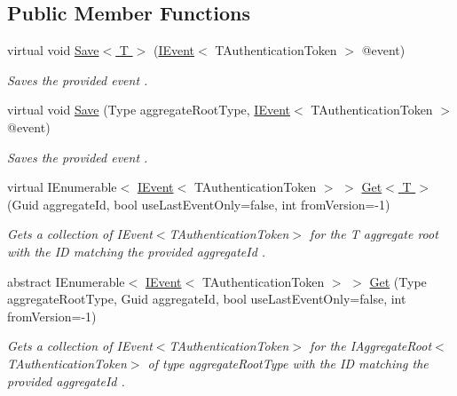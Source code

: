 \subsection*{Public Member Functions}
\begin{DoxyCompactItemize}
\item 
virtual void \hyperlink{classCqrs_1_1Events_1_1EventStore_a958854f49c3eb4fcf1922ba7737a8dfe_a958854f49c3eb4fcf1922ba7737a8dfe}{Save$<$ T $>$} (\hyperlink{interfaceCqrs_1_1Events_1_1IEvent}{I\+Event}$<$ T\+Authentication\+Token $>$ @event)
\begin{DoxyCompactList}\small\item\em Saves the provided {\itshape event} . \end{DoxyCompactList}\item 
virtual void \hyperlink{classCqrs_1_1Events_1_1EventStore_a3ba5ba04a36382b6d36a6ad8867dc766_a3ba5ba04a36382b6d36a6ad8867dc766}{Save} (Type aggregate\+Root\+Type, \hyperlink{interfaceCqrs_1_1Events_1_1IEvent}{I\+Event}$<$ T\+Authentication\+Token $>$ @event)
\begin{DoxyCompactList}\small\item\em Saves the provided {\itshape event} . \end{DoxyCompactList}\item 
virtual I\+Enumerable$<$ \hyperlink{interfaceCqrs_1_1Events_1_1IEvent}{I\+Event}$<$ T\+Authentication\+Token $>$ $>$ \hyperlink{classCqrs_1_1Events_1_1EventStore_aa6ffed5d7dd365600669149da29f9e89_aa6ffed5d7dd365600669149da29f9e89}{Get$<$ T $>$} (Guid aggregate\+Id, bool use\+Last\+Event\+Only=false, int from\+Version=-\/1)
\begin{DoxyCompactList}\small\item\em Gets a collection of I\+Event$<$\+T\+Authentication\+Token$>$ for the {\itshape T} aggregate root with the ID matching the provided {\itshape aggregate\+Id} . \end{DoxyCompactList}\item 
abstract I\+Enumerable$<$ \hyperlink{interfaceCqrs_1_1Events_1_1IEvent}{I\+Event}$<$ T\+Authentication\+Token $>$ $>$ \hyperlink{classCqrs_1_1Events_1_1EventStore_aa1d0d399a35c1e3b0759e27202695d8b_aa1d0d399a35c1e3b0759e27202695d8b}{Get} (Type aggregate\+Root\+Type, Guid aggregate\+Id, bool use\+Last\+Event\+Only=false, int from\+Version=-\/1)
\begin{DoxyCompactList}\small\item\em Gets a collection of I\+Event$<$\+T\+Authentication\+Token$>$ for the I\+Aggregate\+Root$<$\+T\+Authentication\+Token$>$ of type {\itshape aggregate\+Root\+Type}  with the ID matching the provided {\itshape aggregate\+Id} . \end{DoxyCompactList}\item 

\end{DoxyCompactItemize}
